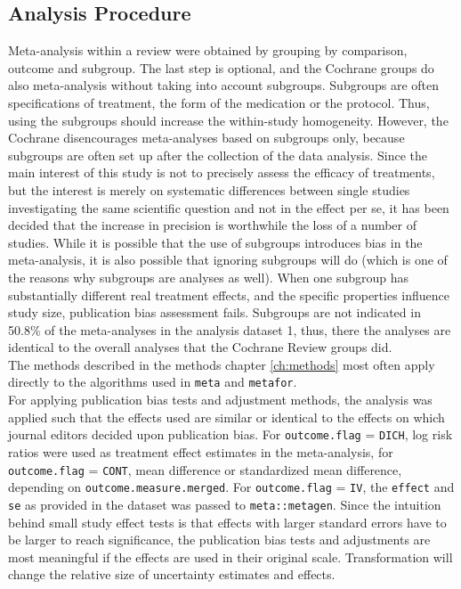 \documentclass[11pt,a4paper,twoside]{book}\usepackage[]{graphicx}\usepackage[]{color}
\begin{document}
\subsection{Analysis Procedure} \label{sec:procedure}
Meta-analysis within a review were obtained by grouping by comparison, outcome and subgroup. The last step is optional, and the Cochrane groups do also meta-analysis without taking into account subgroups. Subgroups are often specifications of treatment, \eg the form of the medication or the protocol. Thus, using the subgroups should increase the within-study homogeneity. However, the Cochrane disencourages meta-analyses based on subgroups only, because subgroups are often set up after the collection of the data analysis. Since the main interest of this study is not to precisely assess the efficacy of treatments, but the interest is merely on systematic differences between single studies investigating the same scientific question and not in the effect per se, it has been decided that the increase in precision is worthwhile the loss of a number of studies. While it is possible that the use of subgroups introduces bias in the meta-analysis, it is also possible that ignoring subgroups will do (which is one of the reasons why subgroups are analyses as well). When one subgroup has substantially different real treatment effects, and the specific properties influence study size, publication bias assessment fails. Subgroups are not indicated in 50.8\% of the meta-analyses in the analysis dataset 1, thus, there the analyses are identical to the overall analyses that the Cochrane Review groups did. \\
The methods described in the methods chapter \ref{ch:methods} most often apply directly to the algorithms used in \texttt{meta} and \texttt{metafor}. \\
For applying publication bias tests and adjustment methods, the analysis was applied such that the effects used are similar or identical to the effects on which journal editors decided upon publication bias. For \texttt{outcome.flag} = \texttt{DICH}, log risk ratios were used as treatment effect estimates in the meta-analysis, for \texttt{outcome.flag} = \texttt{CONT}, mean difference or standardized mean difference, depending on \texttt{outcome.measure.merged}. For \texttt{outcome.flag} = \texttt{IV}, the \texttt{effect} and \texttt{se} as provided in the dataset was passed to \texttt{meta::metagen}. Since the intuition behind small study effect tests is that effects with larger standard errors have to be larger to reach significance, the publication bias tests and adjustments are most meaningful if the effects are used in their original scale. Transformation will change the relative size of uncertainty estimates and effects.\\
\end{document}
